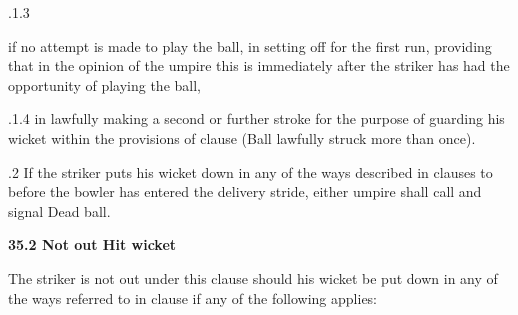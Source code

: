 \documentclass[12pt]{article}
\begin{document}
\vspace{\baselineskip}
\begin{adjustwidth}{1.18in}{0.14in}
{\fontsize{9pt}{10.8pt}.1.3 \tabto{1.17in} {\fontsize{8pt}{9.6pt}\selectfont if no attempt is made to play the ball, in setting off for the first run, providing that in the opinion of the umpire this is immediately after the striker has had the opportunity of playing the ball,\par}\par}\par

\end{adjustwidth}


\vspace{\baselineskip}
\begin{adjustwidth}{1.18in}{0.21in}
{\fontsize{9pt}{10.8pt}.1.4 \tabto{1.17in} in lawfully making a second or further stroke for the purpose of guarding his wicket within the provisions of clause (Ball lawfully struck more than once).\par}\par

\end{adjustwidth}


\vspace{\baselineskip}
\begin{adjustwidth}{0.5in}{0.25in}
{\fontsize{9pt}{10.8pt}.2 \tabto{0.49in} If the striker puts his wicket down in any of the ways described in clauses to before the bowler has entered the delivery stride, either umpire shall call and signal Dead ball.\par}\par

\end{adjustwidth}


\vspace{\baselineskip}
{\fontsize{11pt}{13.2pt}\selectfont \textbf{35.2 \tabto{0.47in} Not out Hit wicket}\par}\par


\vspace{\baselineskip}
\begin{adjustwidth}{0.0in}{0.14in}
{\fontsize{9pt}{10.8pt}\selectfont The striker is not out under this clause should his wicket be put down in any of the ways referred to in clause if any of the following applies:\par}\par

\end{adjustwidth}
\end{document}
